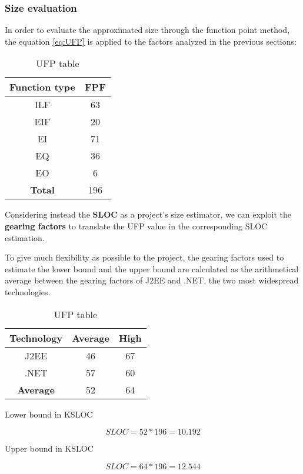 \subsubsection{Size evaluation}

In order to evaluate the approximated size through the function point method, the equation \ref{eq:UFP} is applied to the factors analyzed in the previous sections:

\begin{table}[h!]
        \centering
        \begin{tabular}{|c|c|}
	\hline
	\textbf{Function type} & \textbf{FPF} \\
	\hline
        ILF & 63 \\
	EIF & 20 \\
	EI & 71 \\
	EQ & 36 \\
	EO & 6 \\
	\hline
	\textbf{Total} & 196 \\
	\hline
	\end{tabular}
        \caption{UFP table}
        \label{table:UFPT}
\end{table}

Considering instead the \textbf{SLOC} as a project's size estimator, we can exploit the \textbf{gearing factors} to translate the UFP value in the corresponding SLOC estimation.

To give much flexibility as possible to the project, the gearing factors used to estimate the lower bound and the upper bound are calculated as the
arithmetical average between the gearing factors of J2EE and .NET, the two most widespread technologies.

\begin{table}[h!]
        \centering
        \begin{tabular}{|c|c|c|}
	\hline
	\textbf{Technology} & \textbf{Average} & \textbf{High} \\
	\hline
        J2EE & 46 & 67 \\
        .NET & 57 & 60 \\
	\hline
        \textbf{Average} & 52 & 64 \\
	\hline
        \end{tabular}
        \caption{UFP table}
        \label{table:UFPT}
\end{table}

Lower bound in KSLOC

\begin{displaymath}
	SLOC =  52 * 196 = 10.192
\end{displaymath}

Upper bound in KSLOC

\begin{displaymath}
	SLOC = 64 * 196 = 12.544
\end{displaymath}
